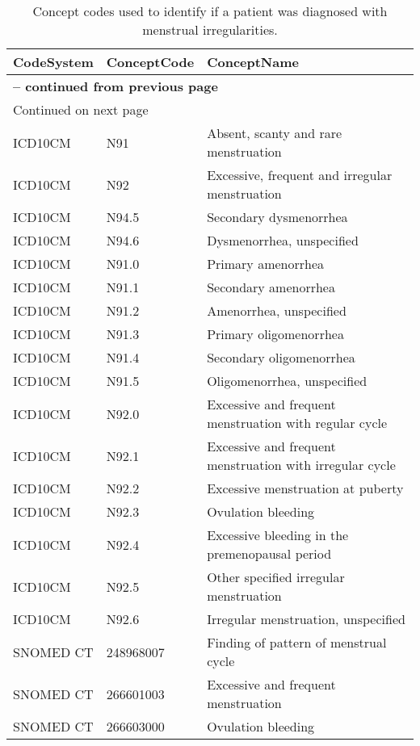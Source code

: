 \begin{longtable}{p{}p{}p{}}
\caption{Concept codes used to identify if a patient was diagnosed with menstrual irregularities.} \\ 
 CodeSystem & ConceptCode & ConceptName \\ 
  \hline 
\endfirsthead 
\multicolumn{3}{p{\textwidth}}{{ \bfseries \tablename \thetable{} -- continued from previous page}} \ 
\hline CodeSystem & ConceptCode & ConceptName \\ \hline 
\endhead 
\hline \multicolumn{3}{p{\textwidth}}{{Continued on next page}} \\ \hline 
\endfoot 
\hline 
\endlastfoot 
 \hline
ICD10CM & N91 & Absent, scanty and rare menstruation \\ 
  ICD10CM & N92 & Excessive, frequent and irregular menstruation \\ 
  ICD10CM & N94.5 & Secondary dysmenorrhea \\ 
  ICD10CM & N94.6 & Dysmenorrhea, unspecified \\ 
  ICD10CM & N91.0 & Primary amenorrhea \\ 
  ICD10CM & N91.1 & Secondary amenorrhea \\ 
  ICD10CM & N91.2 & Amenorrhea, unspecified \\ 
  ICD10CM & N91.3 & Primary oligomenorrhea \\ 
  ICD10CM & N91.4 & Secondary oligomenorrhea \\ 
  ICD10CM & N91.5 & Oligomenorrhea, unspecified \\ 
  ICD10CM & N92.0 & Excessive and frequent menstruation with regular cycle \\ 
  ICD10CM & N92.1 & Excessive and frequent menstruation with irregular cycle \\ 
  ICD10CM & N92.2 & Excessive menstruation at puberty \\ 
  ICD10CM & N92.3 & Ovulation bleeding \\ 
  ICD10CM & N92.4 & Excessive bleeding in the premenopausal period \\ 
  ICD10CM & N92.5 & Other specified irregular menstruation \\ 
  ICD10CM & N92.6 & Irregular menstruation, unspecified \\ 
  SNOMED CT & 248968007 & Finding of pattern of menstrual cycle \\ 
  SNOMED CT & 266601003 & Excessive and frequent menstruation \\ 
  SNOMED CT & 266603000 & Ovulation bleeding \\ 

\end{longtable}
